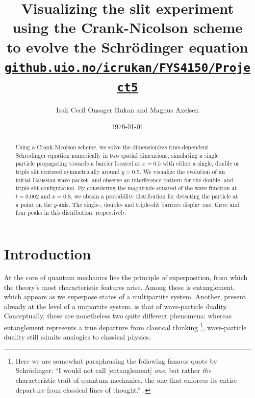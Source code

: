 \documentclass[aps,pra,reprint,amsmath,amssymb,twocolumn,preprintnumbers,superscriptaddress,10pt]{revtex4-2}
\begin{document}
\title{Visualizing the slit experiment using the Crank-Nicolson scheme to evolve the Schr\"odinger equation \\[0.5em]
  \small \href{https://github.uio.no/icrukan/FYS4150/tree/master/Project5}{\texttt{github.uio.no/icrukan/FYS4150/Project5}}
}
\author{Isak Cecil Onsager Rukan and Magnus Axelsen} %
\date{\today}                             %
\noaffiliation                            %

\begin{abstract}
    Using a Crank-Nicolson scheme, we solve the dimensionless time-dependent Schrödinger equation numerically in two spatial dimensions, simulating a single particle propagating towards a barrier located at \(x=0.5\) with either a single, double or triple slit centered symmetrically around \(y=0.5\). We visualize the evolution of an initial Gaussian wave packet, and observe an interference pattern for the double- and triple-slit configuration. By considering the magnitude squared of the wave function at \(t=0.002\) and \(x=0.8\), we obtain a probability distribution for detecting the particle at a point on the \(y\)-axis. The single-, double- and triple-slit barriers display one, three and four peaks in this distribution, respectively. 
\end{abstract}
\maketitle

\section{Introduction}
At the core of quantum mechanics lies the principle of superposition, from which the theory's most characteristic features arise.
Among these is entanglement, which appears as we superpose states of a multipartite system.
Another, present already at the level of a unipartite system, is that of wave-particle duality.
Conceptually, these are nonetheless two quite different phenomena:
whereas entanglement represents a true departure from classical thinking \footnote{Here we are somewhat paraphrasing the following famous quote by Schrödinger; ``I would not call [entanglement] \textit{one}, but rather \textit{the} characteristic trait of quantum mechanics, the one that enforces its entire departure from classical lines of thought.'' \cite{schrodinger1935}.}, wave-particle duality still admits analogies to classical physics.
\end{document}
